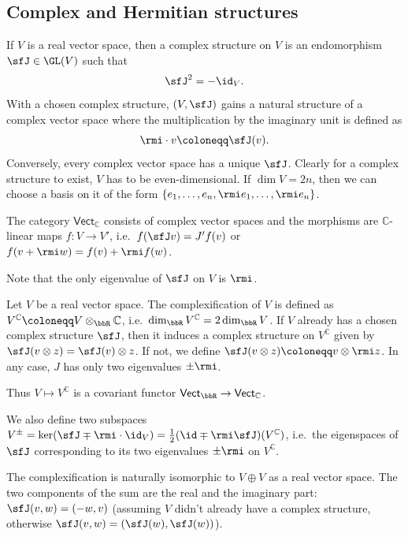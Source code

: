 \subsection{Complex and Hermitian structures}

\begin{defn}
    If $V$ is a real vector space, then a complex structure on $V$ is an endomorphism $\sfJ\in \GL(V)$ such that 
    \[\sfJ^2=-\id_V.\]
    With a chosen complex structure, $(V,\sfJ)$ gains a natural structure of a complex vector space where the multiplication by the imaginary unit is defined as
    \[\rmi\cdot v\coloneqq \sfJ(v).\]
    Conversely, every complex vector space has a unique $\sfJ$. Clearly for a complex structure to exist, $V$ has to be even-dimensional. If $\dim V=2n$, then we can choose a basis on it of the form $\{e_1,\ldots,e_n,\rmi e_1,\ldots,\rmi e_n\}$.
    
    The category $\mathsf{Vect}_{\mathbb{C}}$ consists of complex vector spaces and the morphisms are $\mathbb{C}$-linear maps $f:V\to V'$, i.e.\ $f(\sfJ v)=J' f(v)$ or $f(v+\rmi w)=f(v)+\rmi f(w)$.
\end{defn}

Note that the only eigenvalue of $\sfJ$ on $V$ is $\rmi$.

\begin{defn}[Complexification]\label{def complexification}
    Let $V$ be a real vector space. The complexification of $V$ is defined as $V^\mathbb{C}\coloneqq V\otimes_\bbR \mathbb{C}$, i.e.\ $\dim_\bbR V^\mathbb{C}=2\dim_\bbR V$. If $V$ already has a chosen complex structure $\sfJ$, then it induces a complex structure on $V^\mathbb{C}$ given by $\sfJ(v\otimes z)=\sfJ(v)\otimes z$. If not, we define $\sfJ(v\otimes z)\coloneqq v\otimes \rmi z$. In any case, $J$ has only two eigenvalues $\pm \rmi$.
    
    Thus $V\mapsto V^{\mathbb{C}}$ is a covariant functor $\mathsf{Vect}_\bbR \to \mathsf{Vect}_\mathbb{C}$.
    
    We also define two subspaces $V^\pm=\ker(\sfJ\mp \rmi\cdot\id_V)=\frac12(\id\mp \rmi \sfJ)(V^\mathbb{C})$, i.e.\ the eigenspaces of $\sfJ$ corresponding to its two eigenvalues $\pm \rmi$ on $V^\mathbb{C}$.
\end{defn}

The complexification is naturally isomorphic to $V\oplus V$ as a real vector space. The two components of the sum are the real and the imaginary part: $\sfJ(v,w)=(-w,v)$ (assuming $V$ didn't already have a complex structure, otherwise $\sfJ(v,w)=(\sfJ(w),\sfJ(w))$).


